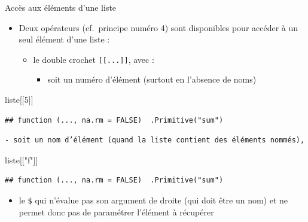 \documentclass[
  ignorenonframetext,
]{beamer}
\newenvironment{Shaded}{\begin{snugshade}}{\end{snugshade}}
\newcommand{\DecValTok}[1]{\textcolor[rgb]{0.00,0.00,0.81}{#1}}
\newcommand{\NormalTok}[1]{#1}
\newcommand{\StringTok}[1]{\textcolor[rgb]{0.31,0.60,0.02}{#1}}
\providecommand{\tightlist}{%
  \setlength{\itemsep}{0pt}\setlength{\parskip}{0pt}}
\begin{document}
\begin{frame}[fragile]{Accès aux éléments d'une liste}
\protect\hypertarget{accuxe8s-aux-uxe9luxe9ments-dune-liste}{}
\begin{itemize}
\tightlist
\item
  Deux opérateurs (cf.~principe numéro 4) sont disponibles pour accéder
  à un seul élément d'une liste :

  \begin{itemize}
  \tightlist
  \item
    le double crochet \texttt{{[}{[}...{]}{]}}, avec :

    \begin{itemize}
    \tightlist
    \item
      soit un numéro d'élément (surtout en l'absence de noms)
    \end{itemize}
  \end{itemize}
\end{itemize}

\tiny

\begin{Shaded}
\begin{Highlighting}[]
\NormalTok{liste[[}\DecValTok{5}\NormalTok{]]}
\end{Highlighting}
\end{Shaded}

\begin{verbatim}
## function (..., na.rm = FALSE)  .Primitive("sum")
\end{verbatim}

\normalsize

\begin{verbatim}
- soit un nom d’élément (quand la liste contient des éléments nommés),
\end{verbatim}

\tiny

\begin{Shaded}
\begin{Highlighting}[]
\NormalTok{liste[[}\StringTok{"f"}\NormalTok{]]}
\end{Highlighting}
\end{Shaded}

\begin{verbatim}
## function (..., na.rm = FALSE)  .Primitive("sum")
\end{verbatim}

\normalsize

\begin{itemize}
\tightlist
\item
  le \texttt{\$} qui n'évalue pas son argument de droite (qui doit être
  un nom) et ne permet donc pas de paramétrer l'élément à récupérer
\end{itemize}


\end{frame}
\end{document}
